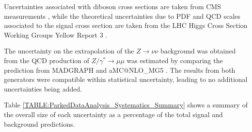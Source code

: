 Uncertainties associated with diboson cross sections are taken from \gls{CMS} measurements \cite{ARTICLE:CMSMeasurmentOfWWandZZxsec}, while the theoretical uncertainties due to \gls{PDF} and \gls{QCD} scales associated to the signal cross section are taken from the \gls{LHC} Higgs Cross Section Working Groups Yellow Report 3 \cite{ARTICLE:HandbookofLHCHiggsCrossSectionsInclusiveObservables,ARTICLE:HandbookofLHCHiggsCrossSectionsDifferentialDistributions}.

The uncertainty on the extrapolation of the  $Z\rightarrow\nu\nu$ background was obtained from the \gls{QCD} production of $Z/\gamma^{*}\rightarrow\mu\mu$ was estimated by comparing the prediction from \textsc{MADGRAPH} and a\textsc{MC@NLO\_MG5} \cite{ARTICLE:aMCatNLO}. The results from both generators were compatible within statistical uncertainty, leading to no additional uncertainties being added. 

Table \ref{TABLE:ParkedDataAnalysis_Systematics_Summary} shows a summary of the overall size of each uncertainty as a percentage of the total signal and background predictions.

